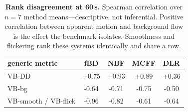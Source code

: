\begin{table}[tb]
\centering
\scriptsize
\setlength{\tabcolsep}{3pt}
\begin{tabular}{lcccc}
\toprule
generic metric & fBD & NBF & MCFF & DLR \\
\midrule
VB-DD & +0.75 & +0.93 & +0.89 & +0.36 \\
VB-bg & -0.64 & -0.71 & -0.75 & -0.50 \\
VB-smooth / VB-flick & -0.96 & -0.82 & -0.61 & -0.64 \\
\bottomrule
\end{tabular}
\caption{\textbf{Rank disagreement at 60\,s.} Spearman correlation over $n=7$ method means---descriptive, not inferential. Positive correlation between apparent motion and background flow is the effect the benchmark isolates. Smoothness and flickering rank these systems identically and share a row.}
\label{tab:disagreement}
\end{table}